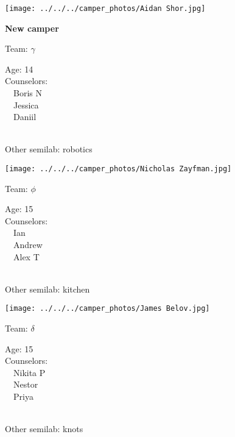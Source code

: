 \documentclass[10pt,letterpaper, landscape]{article}
\begin{document}
\horizontalshiftfornextsticker
\renewcommand{\baselinestretch}{1} \begin{sticker}
\noindent\begin{minipage}{0.5\textwidth}\texttt{[image: ../../../camper\_photos/Aidan Shor.jpg]}\end{minipage}\begin{minipage}{0.45\textwidth}
\textbf{New camper} 

Team: {\Large $\gamma$}

Age:        14\\
Counselors: \\\ \ Boris N\\\ \ Jessica\\\ \ Daniil\\
\end{minipage} \\ \vspace{0.07in}
Other semilab: robotics
\end{sticker}
\horizontalshiftfornextsticker
\renewcommand{\baselinestretch}{1} \begin{sticker}
\noindent\begin{minipage}{0.5\textwidth}\texttt{[image: ../../../camper\_photos/Nicholas Zayfman.jpg]}\end{minipage}\begin{minipage}{0.45\textwidth}
Team: {\Large $\phi$}

Age:        15\\
Counselors: \\\ \ Ian\\\ \ Andrew\\\ \ Alex T\\
\end{minipage} \\ \vspace{0.07in}
Other semilab: kitchen
\end{sticker}
\horizontalshiftfornextsticker
\renewcommand{\baselinestretch}{1} \begin{sticker}
\noindent\begin{minipage}{0.5\textwidth}\texttt{[image: ../../../camper\_photos/James Belov.jpg]}\end{minipage}\begin{minipage}{0.45\textwidth}
Team: {\Large $\delta$}

Age:        15\\
Counselors: \\\ \ Nikita P\\\ \ Nestor\\\ \ Priya\\
\end{minipage} \\ \vspace{0.07in}
Other semilab: knots
\end{sticker}
\end{document}
